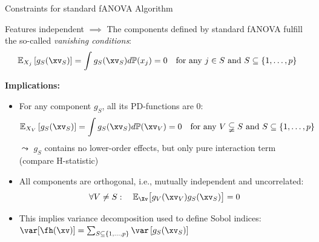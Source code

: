 \documentclass[10pt,compress,t,notes=noshow, xcolor=table]{beamer}
\begin{document}
\begin{frame}{Constraints for standard fANOVA Algorithm}

    \begin{theorem}
    
        Features independent $\implies$ The components defined by standard fANOVA fulfill the so-called \textit{vanishing conditions}:
        \begin{align*}
            \mathbb{E}_{X_j}\left[ g_{S}(\xv_S) \right]
            = \int g_{S}(\xv_S) d \mathbb{P}(x_j) = 0 \quad \text{for any } j \in S \text{ and } S \subseteq \{1, \ldots, p\}
        \end{align*}
    \end{theorem}


    
    \pause 
    \textbf{Implications:}
    \begin{itemize}
        \item 
        For any component $g_{S}$, all its PD-functions are 0:
        $$
        \mathbb{E}_{X_V}\left[ g_{S}(\xv_S) \right]
        = \int g_{S}(\xv_S) d \mathbb{P}(\xv_V) = 0 \quad \text{for any } V \subsetneqq S \text{ and } S \subseteq \{1, \ldots, p\}
        $$
        $\leadsto$ $g_{S}$ contains no lower-order effects, but only pure interaction term \\
        (compare H-statistic)
        \pause
        \item All components are orthogonal, i.e., mutually independent and uncorrelated:
        $$
        \forall V \neq S: \quad \mathbb{E}_{\Xv} \bigl[ g_{V}(\xv_V) g_{S}(\xv_S) \bigr] = 0
        $$
        \item This implies variance decomposition used to define Sobol indices:
    $ \var[ \fh(\xv) ] =  \textstyle\sum_{S \subseteq \{1,\ldots,p\}}  \var \left[ g_{S}(\xv_S) \right]$
    \end{itemize}
    
\end{frame}
\end{document}
